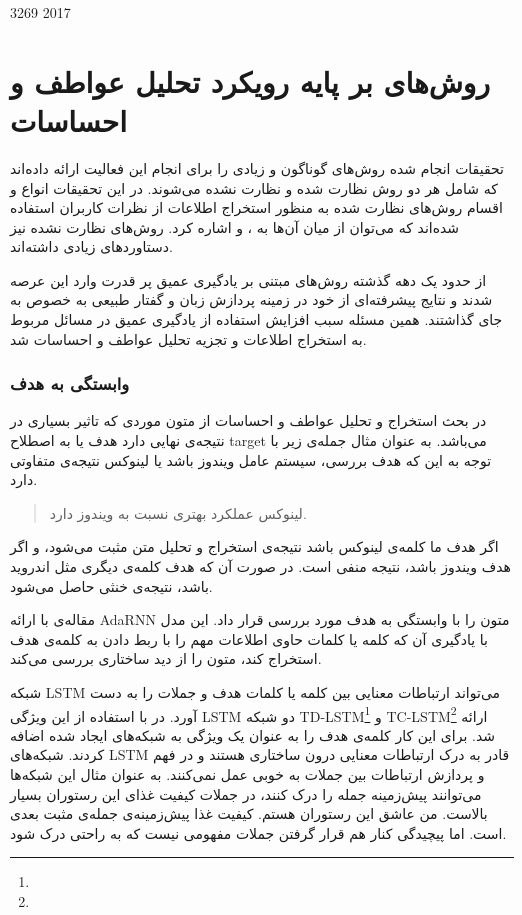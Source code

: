 \documentclass[12pt, a4paper, oneside]{report}
\begin{document}
\cite{yang-etal-2016-hierarchical} 3269 2017


\section{روش‌های بر پایه رویکرد تحلیل عواطف و احساسات}

تحقیقات انجام شده روش‌های گوناگون و زیادی را برای انجام این فعالیت ارائه داده‌اند که شامل هر دو روش
نظارت شده و نظارت نشده می‌شوند.
در این تحقیقات انواع و اقسام روش‌های نظارت شده به منظور استخراج اطلاعات از نظرات کاربران
استفاده شده‌اند که می‌توان از میان آن‌ها به
،
و
اشاره کرد.
روش‌های نظارت نشده نیز دستاورد‌های زیادی داشته‌اند.

از حدود یک دهه گذشته روش‌های مبتنی بر یادگیری عمیق پر قدرت وارد این عرصه شدند و نتایج پیشرفته‌ای
از خود در زمینه پردازش زبان و گفتار طبیعی به خصوص
به جای گذاشتند.
همین مسئله سبب افزایش استفاده از یادگیری عمیق در مسائل مربوط به استخراج اطلاعات و تجزیه تحلیل
عواطف و احساسات شد.
\cite{zhang2018deep}


\subsubsection{وابستگی به هدف}
در بحث استخراج و تحلیل عواطف و احساسات از متون موردی که تاثیر بسیاری در نتیجه‌ی نهایی دارد هدف یا به اصطلاح
target
می‌باشد. به عنوان مثال جمله‌ی زیر با توجه به این که هدف بررسی، سیستم عامل ویندوز باشد یا لینوکس نتیجه‌ی متفاوتی دارد.
\begin{quotation}
    لینوکس عملکرد بهتری نسبت به ویندوز دارد.
\end{quotation}
اگر هدف ما کلمه‌ی لینوکس باشد نتیجه‌ی استخراج و تحلیل متن مثبت می‌شود، و اگر هدف ویندوز باشد، نتیجه منفی است.
در صورت آن که هدف کلمه‌ی دیگری مثل اندروید باشد، نتیجه‌ی خنثی حاصل می‌شود.

مقاله‌ی
\cite{68dong-etal-2014-adaptive}
با ارائه
AdaRNN
متون را با وابستگی به هدف مورد بررسی قرار داد. این مدل با یادگیری آن که کلمه یا کلمات حاوی اطلاعات مهم را با
ربط دادن به کلمه‌ی هدف استخراج کند، متون را از دید ساختاری بررسی می‌کند.

شبکه
LSTM
می‌تواند ارتباطات معنایی بین کلمه‌ یا کلمات هدف و جملات را به دست آورد. در
\cite{70tang-etal-2016-effective}
با استفاده از این ویژگی
LSTM
دو شبکه
TD-LSTM\footnote{}
و
TC-LSTM\footnote{}
ارائه شد. برای این کار کلمه‌ی هدف را به عنوان یک ویژگی به شبکه‌های ایجاد شده اضافه کردند.
شبکه‌های
LSTM
قادر به درک ارتباطات معنایی درون ساختاری هستند و در فهم و پردازش ارتباطات بین جملات به خوبی عمل نمی‌کنند.
به عنوان مثال این شبکه‌ها می‌توانند پیش‌زمینه جمله را درک کنند، در جملات کیفیت غذای این رستوران بسیار بالاست.
من عاشق این رستوران هستم. کیفیت غذا پیش‌زمینه‌ی جمله‌ی مثبت بعدی است. اما پیچیدگی کنار هم
قرار گرفتن جملات مفهومی نیست که به راحتی درک شود.
\end{document}
